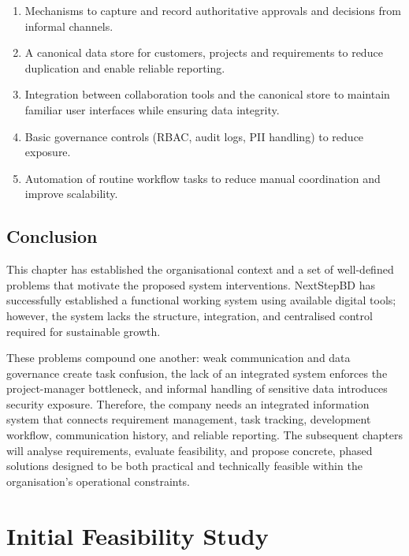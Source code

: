 \documentclass[12pt,a4paper]{report}
\begin{document}
\begin{enumerate}[leftmargin=2em]
    \item Mechanisms to capture and record authoritative approvals and decisions from informal channels.
    \item A canonical data store for customers, projects and requirements to reduce duplication and enable reliable reporting.
    \item Integration between collaboration tools and the canonical store to maintain familiar user interfaces while ensuring data integrity.
    \item Basic governance controls (RBAC, audit logs, PII handling) to reduce exposure.
    \item Automation of routine workflow tasks to reduce manual coordination and improve scalability.
\end{enumerate}

\section{Conclusion}
This chapter has established the organisational context and a set of well-defined problems that motivate the proposed system interventions. NextStepBD has successfully established a functional working system using available digital tools; however, the system lacks the structure, integration, and centralised control required for sustainable growth.

These problems compound one another: weak communication and data governance create task confusion, the lack of an integrated system enforces the project-manager bottleneck, and informal handling of sensitive data introduces security exposure. Therefore, the company needs an integrated information system that connects requirement management, task tracking, development workflow, communication history, and reliable reporting. The subsequent chapters will analyse requirements, evaluate feasibility, and propose concrete, phased solutions designed to be both practical and technically feasible within the organisation's operational constraints.



\chapter{Initial Feasibility Study}
\end{document}
